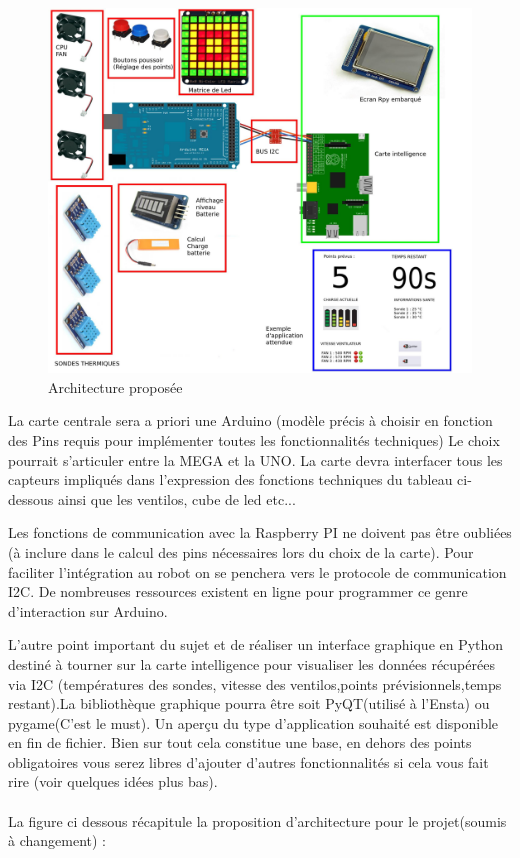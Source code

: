 \documentclass[fleqn,10pt]{SelfArx} %
\begin{document}
\begin{figure}[ht]\centering %
\includegraphics[width=\linewidth]{view}
\caption{Architecture proposée}
\label{fig:view}
\end{figure}
La carte centrale sera a priori une Arduino (modèle précis à choisir en fonction des Pins requis pour implémenter toutes les fonctionnalités techniques) Le choix pourrait s'articuler entre la MEGA et la UNO. La carte devra interfacer tous les capteurs impliqués dans l'expression des fonctions techniques du tableau ci-dessous ainsi que les ventilos, cube de led etc... 

 Les fonctions de communication avec la Raspberry PI ne doivent pas être oubliées (à inclure dans le calcul des pins nécessaires lors du choix de la carte). Pour faciliter l'intégration au robot on se penchera vers le protocole de communication I2C. De nombreuses ressources existent en ligne pour programmer ce genre d'interaction sur Arduino. 
 
 
L'autre point important du sujet et de réaliser un interface graphique en Python destiné à tourner sur la carte intelligence pour visualiser les données récupérées via I2C (températures des sondes, vitesse des ventilos,points prévisionnels,temps restant).La bibliothèque graphique pourra être soit PyQT(utilisé à l'Ensta) ou pygame(C'est le must). Un aperçu du type d'application souhaité est disponible en fin de fichier. Bien sur tout cela constitue une base, en dehors des points obligatoires vous serez libres d'ajouter d'autres fonctionnalités si cela vous fait rire (voir quelques idées plus bas).
\\ \\ La figure ci dessous récapitule la proposition d'architecture pour le projet(soumis à changement) : 
\end{document}
